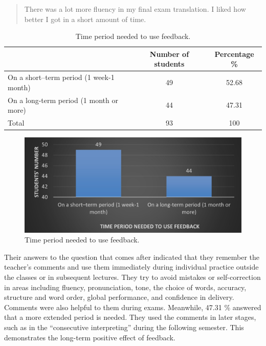 \documentclass[english]{textolivre}
\begin{document}
\begin{quote}
     There was a lot more fluency in my final exam translation. I liked how better I got in a short amount of time.
\end{quote}

\begin{table}[h!]
\centering
\begin{threeparttable}
\caption{Time period needed to use feedback.}
\label{tbl9}
\centering
\begin{tabular}{p{} c c}
\toprule
 & Number of students & Percentage \% \\ \midrule
On a short–term period (1 week-1 month) & 49 & 52.68 \\
On a long-term period (1 month or more) & 44 & 47.31 \\
Total & 93 & 100 \\
\bottomrule
\end{tabular}
\end{threeparttable}
\end{table}

\begin{figure}[h!]
 \centering
 \begin{minipage}{.6\textwidth}
 \includegraphics[width=\textwidth]{09.jpg}
 \caption{Time period needed to use feedback.}
 \label{fig09}
 \end{minipage}
\end{figure}

Their answers to the question that comes after indicated that they remember the teacher’s comments and use them immediately during individual practice outside the classes or in subsequent lectures. They try to avoid mistakes or self-correction in areas including fluency, pronunciation, tone, the choice of words, accuracy, structure and word order, global performance, and confidence in delivery. Comments were also helpful to them during exams. Meanwhile, 47.31 \% answered that a more extended period is needed. They used the comments in later stages, such as in the “consecutive interpreting” during the following semester. This demonstrates the long-term positive effect of feedback.
\end{document}
